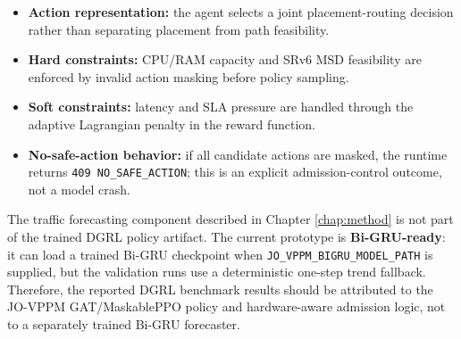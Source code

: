 \documentclass[12pt, a4paper, reqno, oneside]{book}
\begin{document}
\begin{itemize}
    \item \textbf{Action representation:} the agent selects a joint placement-routing decision rather than separating placement from path feasibility.
    \item \textbf{Hard constraints:} CPU/RAM capacity and SRv6 MSD feasibility are enforced by invalid action masking before policy sampling.
    \item \textbf{Soft constraints:} latency and SLA pressure are handled through the adaptive Lagrangian penalty in the reward function.
    \item \textbf{No-safe-action behavior:} if all candidate actions are masked, the runtime returns \texttt{409 NO\_SAFE\_ACTION}; this is an explicit admission-control outcome, not a model crash.
\end{itemize}

The traffic forecasting component described in Chapter \ref{chap:method} is not part of the trained DGRL policy artifact. The current prototype is \textbf{Bi-GRU-ready}: it can load a trained Bi-GRU checkpoint when \texttt{JO\_VPPM\_BIGRU\_MODEL\_PATH} is supplied, but the validation runs use a deterministic one-step trend fallback. Therefore, the reported DGRL benchmark results should be attributed to the JO-VPPM GAT/MaskablePPO policy and hardware-aware admission logic, not to a separately trained Bi-GRU forecaster.

\newpage
{} 
\printbibliography
\end{document}
